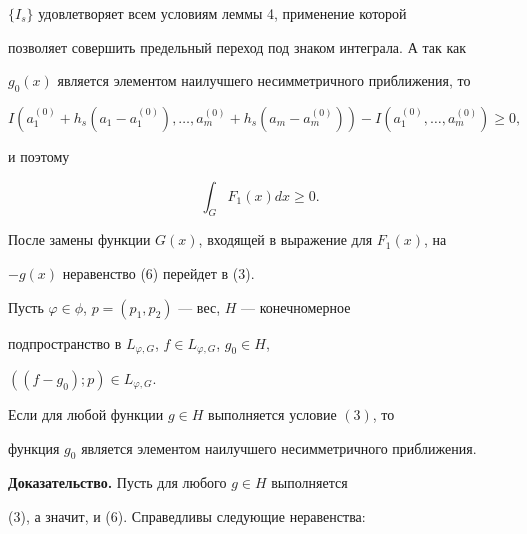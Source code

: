 \begin{pf}
$\{I_s\}$ удовлетворяет всем условиям леммы 4, применение которой 


позволяет совершить предельный переход под знаком интеграла. А так как 


$g_0(x)$ является элементом наилучшего несимметричного приближения, то 


$$ 


I(a_1^{(0)}+h_s(a_1-a_1^{(0)}),\dotsc,a_m^{(0)}+ 


h_s(a_m-a_m^{(0)}))-I(a_1^{(0)},\dotsc,a_m^{(0)})\ge0,


$$ 


и поэтому 


\begin{equation} 


\int_G F_1(x)dx\ge0. 


\end{equation} 


После замены функции $G(x)$, входящей в выражение для $F_1(x)$, на 


$-g(x)$ неравенство (6) перейдет в (3). 


\end{pf} 


 


 


\begin{lem} 


Пусть $\varphi\in\phi$, $p=(p_1,p_2)$ --- вес, $H$ --- конечномерное 


подпространство в $L_{\varphi,G}$, $f\in L_{\varphi,G}$, $g_0\in H$, 


$((f-g_0);p)\in L_{\varphi,G}$. 


 


Если для любой функции $g\in H$ выполняется условие $(3)$, то 


функция $g_0$ является элементом наилучшего несимметричного приближения. 


\end{lem} 


 


 


{\bf Доказательство.} Пусть для любого $g\in H$ выполняется 


(3), а значит, и (6). Справедливы следующие неравенства: 


